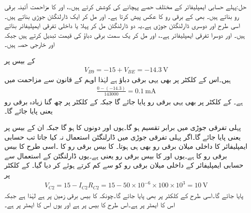 حل:پہلے حسابی ایمپلیفائر کے مختلف حصے پہچانے کی کوشش کرتے ہیں۔،  اور  کا مزاحمت آئینہ برقی رو بناتے ہیں۔ بھی  کے برقی رو کا عکس پیش کرتا ہے۔ اور  مل کر ایک ڈارلنگٹن جوڑی بناتے ہیں۔اسی طرح  اور  دوسری ڈارلنگٹن جوڑی ہے۔یہ دو ڈارلنگٹن مل کر پہلا یا داخلی تفرقی ایمپلیفائر بناتے ہیں۔ اور  دوسرا تفرقی ایمپلیفائر ہے۔،  اور  مل کر یک سمت برقی دباؤ  کی قیمت تبدیل کرتے ہیں جبکہ  اور  خارجی حصہ ہیں۔

 کے بیس پر
\begin{align*}
V_{B9}=-15+V_{BE}=\SI{-14.3}{\volt}
\end{align*}
ہیں۔اس کے کلکٹر پر بھی یہی برقی دباؤ ہے لہٰذا اوہم کے قانون سے  مزاحمت میں
\begin{align*}
\frac{0-(-14.3)}{143000}=\SI{0.1}{\milli \ampere}
\end{align*}
ہے۔ کے کلکٹر پر بھی یہی برقی رو پایا جائے گا جبکہ  کے کلکٹر پر چھ گنا زیادہ برقی رو یعنی  پایا جائے گا۔

پہلی تفرقی جوڑی میں   برابر تقسیم ہو گا۔یوں  اور  دونوں کا  ہو گا جبکہ ان کے بیس پر  یعنی  پایا جائے گا۔اگر پہلی تفرقی جوڑی میں ڈارلنگٹن استعمال نہ کیا جاتا تب حسابی ایمپلیفائر کا داخلی میلان برقی رو بھی  ہی ہوتا۔ کا بیس برقی رو  کا ۔اسی طرح  کا بیس برقی رو  کا  ہے۔یوں  اور  کا بیس برقی رو  یعنی  ہے۔یوں ڈارلنگٹن کے استعمال سے حسابی ایمپلیفائر کے داخلی میلان برقی رو کو  سے کم کرتے ہوئے  کر دیا گیا۔ کے کلکٹر پر
\begin{align*}
V_{C2}=15-I_{C2} R_{C2}=15 - 50 \times 10^{-6} \times 100 \times 10^{3}=\SI{10}{\volt}
\end{align*}   
پایا جائے گا۔اسی طرح  کے کلکٹر پر بھی  پایا جائے گا۔چونکہ  کا بیس برقی زمین پر ہے لہٰذا  ہے جبکہ اس کا ایمٹر  پر ہے۔اس طرح  کا بیس  پر ہے اور یوں اس کا ایمٹر  پر ہے۔

